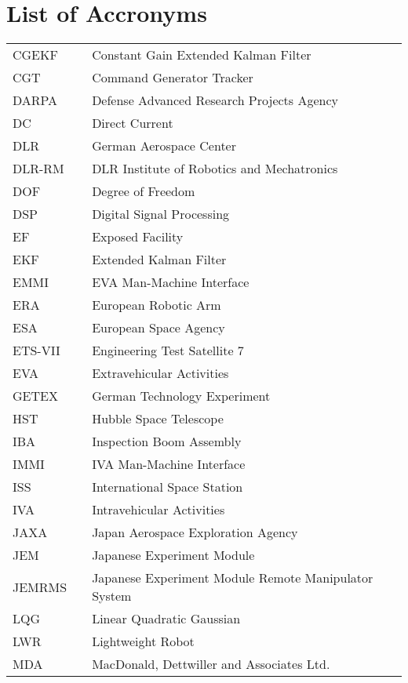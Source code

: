 \chapter*{List of Accronyms}

\begin{longtable}[ht]{lll}
			CGEKF		&  & Constant Gain Extended Kalman Filter\\
			CGT			&  & Command Generator Tracker\\
			DARPA		&  & Defense Advanced Research Projects Agency\\
			DC      &  & Direct Current\\
			DLR			&	 & German Aerospace Center\\
			DLR-RM  &  & DLR Institute of Robotics and Mechatronics\\
			DOF 		&  & Degree of Freedom\\
			DSP     &  & Digital Signal Processing\\
			EF  		&  & Exposed Facility\\
			EKF			&  & Extended Kalman Filter\\
			EMMI		&  & EVA Man-Machine Interface\\
			ERA			&  & European Robotic Arm\\
			ESA 		&  & European Space Agency\\
			ETS-VII	&  & Engineering Test Satellite 7\\
			EVA			&  & Extravehicular Activities\\
			GETEX		&	 & German Technology Experiment\\
			HST     &  & Hubble Space Telescope\\
			IBA			&  & Inspection Boom Assembly\\
			IMMI		&  & IVA Man-Machine Interface\\
			ISS 		&  & International Space Station\\
			IVA			&  & Intravehicular Activities\\
			JAXA 		&  & Japan Aerospace Exploration Agency\\
			JEM 		&  & Japanese Experiment Module\\
			JEMRMS	&  & Japanese Experiment Module Remote Manipulator System\\
			LQG			&  & Linear Quadratic Gaussian\\
			LWR     &  & Lightweight Robot\\
			MDA			&  & MacDonald, Dettwiller and Associates Ltd.\\

\end{longtable}
